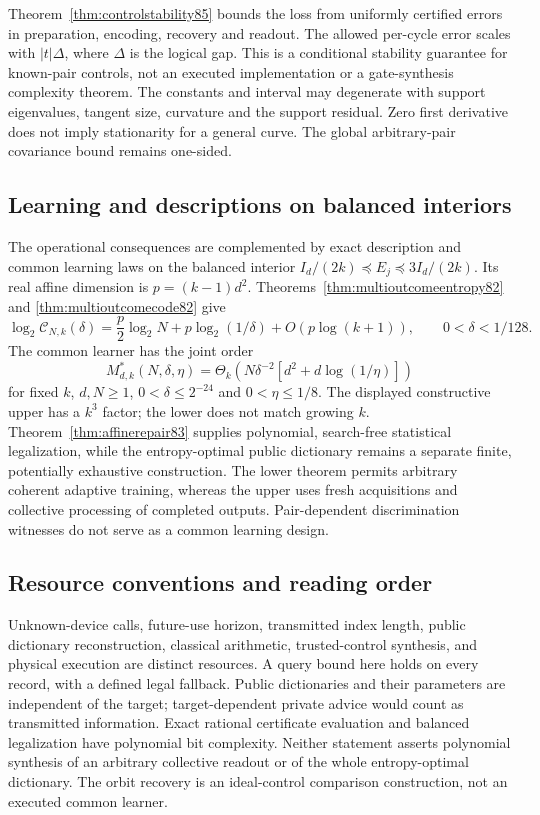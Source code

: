 Theorem~\ref{thm:controlstability85} bounds the loss from uniformly
certified errors in preparation, encoding, recovery and readout.
The allowed per-cycle error scales with $|t|\Delta$, where $\Delta$
is the logical gap.  This is a conditional stability guarantee for
known-pair controls, not an executed implementation or a gate-synthesis
complexity theorem.  The constants and interval may degenerate with
support eigenvalues, tangent size, curvature and the support residual.
Zero first derivative does not imply stationarity for a general curve.
The global arbitrary-pair covariance bound remains one-sided.

\subsection{Learning and descriptions on balanced interiors}
The operational consequences are complemented by exact description
and common learning laws on the balanced interior
$I_d/(2k)\preceq E_j\preceq3I_d/(2k)$.  Its real affine dimension
is $p=(k-1)d^2$.  Theorems~\ref{thm:multioutcomeentropy82} and
\ref{thm:multioutcomecode82} give
\[
 \log_2\mathcal C_{N,k}(\delta)
 =\frac p2\log_2N+p\log_2(1/\delta)+O(p\log(k+1)),
 \qquad 0<\delta<1/128.
\]
The common learner has the joint order
\[
 M^*_{d,k}(N,\delta,\eta)
 =\Theta_k\!\left(N\delta^{-2}[d^2+d\log(1/\eta)]\right)
\]
for fixed $k$, $d,N\ge1$, $0<\delta\le2^{-24}$ and
$0<\eta\le1/8$.  The displayed constructive upper has a $k^3$
factor; the lower does not match growing $k$.
Theorem~\ref{thm:affinerepair83} supplies polynomial, search-free
statistical legalization, while the entropy-optimal public dictionary
remains a separate finite, potentially exhaustive construction.
The lower theorem permits arbitrary coherent adaptive training,
whereas the upper uses fresh acquisitions and collective processing
of completed outputs.  Pair-dependent discrimination witnesses do
not serve as a common learning design.

\subsection{Resource conventions and reading order}
Unknown-device calls, future-use horizon, transmitted index length,
public dictionary reconstruction, classical arithmetic, trusted-control
synthesis, and physical execution are distinct resources.  A query
bound here holds on every record, with a defined legal fallback.
Public dictionaries and their parameters are independent of the
target; target-dependent private advice would count as transmitted
information.  Exact rational certificate evaluation and balanced
legalization have polynomial bit complexity.  Neither statement
asserts polynomial synthesis of an arbitrary collective readout or
of the whole entropy-optimal dictionary.  The orbit recovery is an
ideal-control comparison construction, not an executed common learner.

